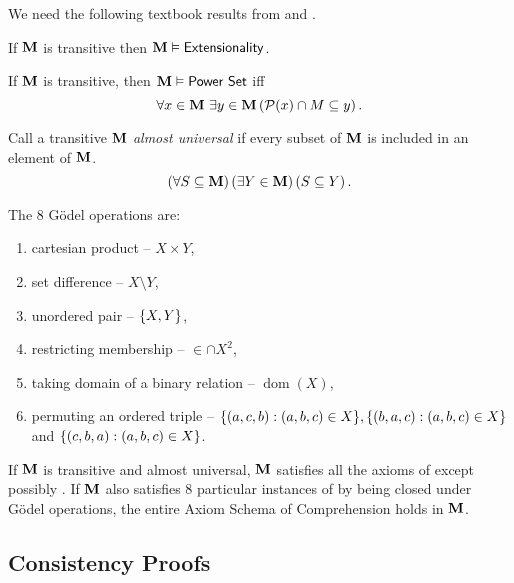We need the following textbook results from \autocite{kunen1980} and \autocite{jech1973}.

\begin{lemma} \label{lemma:transitive_extensional}
    If \(\mathbf{M}\) is transitive then \(\mathbf{M}\vDash{\normalfont\textsf{Extensionality}}\).
\end{lemma}

\begin{lemma} \label{lemma:power_set}
    If \(\mathbf{M}\) is transitive, then \(\mathbf{M}\vDash{\normalfont\textsf{Power Set}}\) iff
    \[ \forall x\in\mathbf{M}\ \exists y\in \mathbf{M} \left(\mathcal{P}(x)\cap M \subseteq y\right). \]
\end{lemma}

\begin{definition}
    Call a transitive \(\mathbf{M}\) \emph{almost universal} if
    every subset of \(\mathbf{M}\) is included in an element of \(\mathbf{M}\).
    \[ \left(\forall S\subseteq \mathbf{M}\right)\left(\exists Y\in \mathbf{M}\right)\left(S\subseteq Y\right). \]
\end{definition}
\begin{definition}
    The 8 Gödel operations are:
    \begin{enumerate}
        \item cartesian product -- \(X\times Y\),
        \item set difference -- \(X\setminus Y\),
        \item unordered pair -- \({\left\{ X, Y \right\}}\),
        \item restricting membership --  \(\in \cap X^2\),
        \item taking domain of a binary relation -- \(\operatorname{dom}(X)\),
        \item permuting an ordered triple -- \({\left\{ (a,c,b): (a,b,c)\in X \right\}}, {\left\{ (b,a,c): (a,b,c)\in X \right\}}\) and \({\left\{ (c,b,a): (a,b,c)\in X \right\}}\).
    \end{enumerate}
\end{definition}
\begin{theorem} \label{theorem:jech_zf_model}
    If \(\mathbf{M}\) is transitive and almost universal,
    \(\mathbf{M}\) satisfies all the axioms of \ZFminus except possibly .
    If \(\mathbf{M}\) also satisfies 8 particular instances of  by being closed under Gödel operations,
    the entire Axiom Schema of Comprehension holds in \(\mathbf{M}\).
\end{theorem}

\subsection{Consistency Proofs}


